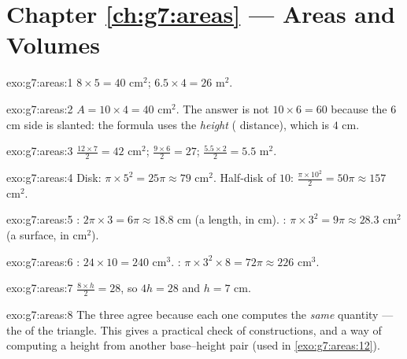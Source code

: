 \section*{Chapter \ref{ch:g7:areas} --- Areas and Volumes}

\begin{solution}{exo:g7:areas:1}
$8 \times 5 = 40$ cm$^2$; \qquad $6.5 \times 4 = 26$ m$^2$.
\end{solution}

\begin{solution}{exo:g7:areas:2}
$A = 10 \times 4 = 40$ cm$^2$. The answer is not
$10 \times 6 = 60$ because the $6$ cm side is slanted: the formula
uses the \emph{height} ( distance), which is $4$ cm.
\end{solution}

\begin{solution}{exo:g7:areas:3}
$\frac{12 \times 7}{2} = 42$ cm$^2$; \quad
$\frac{9 \times 6}{2} = 27$; \quad
$\frac{5.5 \times 2}{2} = 5.5$ m$^2$.
\end{solution}

\begin{solution}{exo:g7:areas:4}
Disk: $\pi \times 5^2 = 25\pi \approx 79$ cm$^2$. Half-disk of 
$10$: $\frac{\pi \times 10^2}{2} = 50\pi \approx 157$ cm$^2$.
\end{solution}

\begin{solution}{exo:g7:areas:5}
: $2\pi \times 3 = 6\pi \approx 18.8$ cm (a length, in cm).
: $\pi \times 3^2 = 9\pi \approx 28.3$ cm$^2$ (a surface, in
cm$^2$).
\end{solution}

\begin{solution}{exo:g7:areas:6}
: $24 \times 10 = 240$ cm$^3$. :
$\pi \times 3^2 \times 8 = 72\pi \approx 226$ cm$^3$.
\end{solution}

\begin{solution}{exo:g7:areas:7}
$\frac{8 \times h}{2} = 28$, so $4h = 28$ and $h = 7$ cm.
\end{solution}

\begin{solution}{exo:g7:areas:8}
The three  agree because each one computes the \emph{same}
quantity --- the  of the triangle. This gives a practical check
of constructions, and a way of computing a height from another
base--height pair (used in \cref{exo:g7:areas:12}).
\end{solution}


